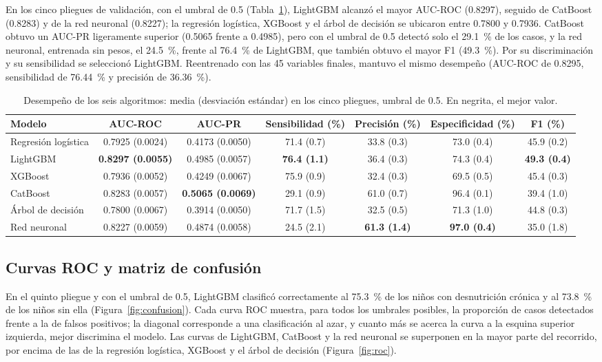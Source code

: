 \documentclass[final,5p,times,twocolumn,authoryear,lefttitle]{elsarticle}
\begin{document}
En los cinco pliegues de validación, con el umbral de 0.5 (Tabla~\ref{tab:modelos}), LightGBM alcanzó el mayor AUC-ROC (0.8297), seguido de CatBoost (0.8283) y de la red neuronal (0.8227); la regresión logística, XGBoost y el árbol de decisión se ubicaron entre 0.7800 y 0.7936. CatBoost obtuvo un AUC-PR ligeramente superior (0.5065 frente a 0.4985), pero con el umbral de 0.5 detectó solo el 29.1~\% de los casos, y la red neuronal, entrenada sin pesos, el 24.5~\%, frente al 76.4~\% de LightGBM, que también obtuvo el mayor F1 (49.3~\%). Por su discriminación y su sensibilidad se seleccionó LightGBM. Reentrenado con las 45 variables finales, mantuvo el mismo desempeño (AUC-ROC de 0.8295, sensibilidad de 76.44~\% y precisión de 36.36~\%).

\begin{table}[!tp]
\centering
\caption{Desempeño de los seis algoritmos: media (desviación estándar) en los cinco pliegues, umbral de 0.5. En negrita, el mejor valor.}
\label{tab:modelos}
\begin{tabular}{lcccccc}
\hline
Modelo & AUC-ROC & AUC-PR & Sensibilidad (\%) & Precisión (\%) & Especificidad (\%) & F1 (\%) \\
\hline
Regresión logística & 0.7925 (0.0024) & 0.4173 (0.0050) & 71.4 (0.7) & 33.8 (0.3) & 73.0 (0.4) & 45.9 (0.2) \\
LightGBM & \textbf{0.8297 (0.0055)} & 0.4985 (0.0057) & \textbf{76.4 (1.1)} & 36.4 (0.3) & 74.3 (0.4) & \textbf{49.3 (0.4)} \\
XGBoost & 0.7936 (0.0052) & 0.4249 (0.0067) & 75.9 (0.9) & 32.4 (0.3) & 69.5 (0.5) & 45.4 (0.3) \\
CatBoost & 0.8283 (0.0057) & \textbf{0.5065 (0.0069)} & 29.1 (0.9) & 61.0 (0.7) & 96.4 (0.1) & 39.4 (1.0) \\
Árbol de decisión & 0.7800 (0.0067) & 0.3914 (0.0050) & 71.7 (1.5) & 32.5 (0.5) & 71.3 (1.0) & 44.8 (0.3) \\
Red neuronal & 0.8227 (0.0059) & 0.4874 (0.0058) & 24.5 (2.1) & \textbf{61.3 (1.4)} & \textbf{97.0 (0.4)} & 35.0 (1.8) \\
\hline
\end{tabular}
\end{table}

\subsection{Curvas ROC y matriz de confusión}

En el quinto pliegue y con el umbral de 0.5, LightGBM clasificó correctamente al 75.3~\% de los niños con desnutrición crónica y al 73.8~\% de los niños sin ella (Figura~\ref{fig:confusion}). Cada curva ROC muestra, para todos los umbrales posibles, la proporción de casos detectados frente a la de falsos positivos; la diagonal corresponde a una clasificación al azar, y cuanto más se acerca la curva a la esquina superior izquierda, mejor discrimina el modelo. Las curvas de LightGBM, CatBoost y la red neuronal se superponen en la mayor parte del recorrido, por encima de las de la regresión logística, XGBoost y el árbol de decisión (Figura~\ref{fig:roc}).
\end{document}
